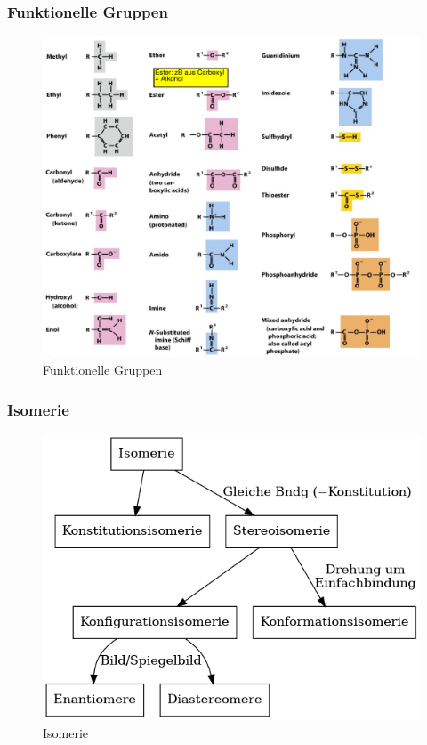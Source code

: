 \documentclass[a4paper,twocolumn,english,fontsize=7,DIV=16]{scrartcl}
\begin{document}
\subsubsection{Funktionelle Gruppen}

\begin{figure}
	\centering
	\includegraphics[width=\linewidth]{img/funktionale_gruppen.png}
	\caption{Funktionelle Gruppen}
\end{figure}

\subsubsection{Isomerie}

\begin{figure}
	\centering
	\includegraphics[width=\linewidth]{graphs/isomerie.png}
	\caption{Isomerie}
\end{figure}
\end{document}
